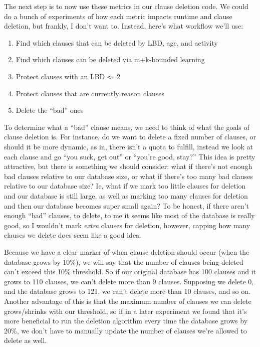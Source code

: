 \documentclass[../main.tex]{subfiles}
\begin{document}
The next step is to now use these metrics in our clause deletion code. We could do 
a bunch of experiments of how each metric impacts runtime and clause deletion, but 
frankly, I don't want to. Instead, here's what workflow we'll use:
\begin{enumerate}
    \item Find which clauses that can be deleted by LBD, age, and activity
    \item Find which clauses can be deleted via m+k-bounded learning
    \item Protect clauses with an LBD \verb|<=| 2
    \item Protect clauses that are currently reason clauses
    \item Delete the ``bad'' ones
\end{enumerate}
\noindent
To determine what a ``bad'' clause means, we need to think of what the goals of 
clause deletion is. For instance, do we want to delete a fixed number of clauses, 
or should it be more dynamic, as in, there isn't a quota to fulfill, instead we look at 
each clause and go ``you suck, get out'' or ``you're good, stay?'' This idea is pretty 
attractive, but there is something we should consider: what if there's not enough bad 
clauses relative to our database size, or what if there's too many bad clauses relative 
to our database size? Ie, what if we mark too little clauses for deletion and our database 
is still large, as well as marking too many clauses for deletion and then our database 
becomes super small again? To be honest, if there aren't enough ``bad'' clauses, to delete,
to me it seems like most of the database is really good, so I wouldn't mark \textit{extra}
clauses for deletion, however, capping how many clauses we delete does seem like a good idea.

Because we have a clear marker of when clause deletion should occur (when the database 
grows by 10\%), we will say that the number of clauses being deleted can't exceed this 
10\% threshold. So if our original database has 100 clauses and it grows to 110 clauses,
we can't delete more than 9 clauses. Supposing we delete 0, and the database grows to 
121, we can't delete more than 10 clauses, and so on. Another advantage of this is 
that the maximum number of clauses we can delete grows/shrinks with our threshold, so 
if in a later experiment we found that it's more beneficial to run the deletion algorithm 
every time the database grows by 20\%, we don't have to manually update the number of 
clauses we're allowed to delete as well.
\end{document}
